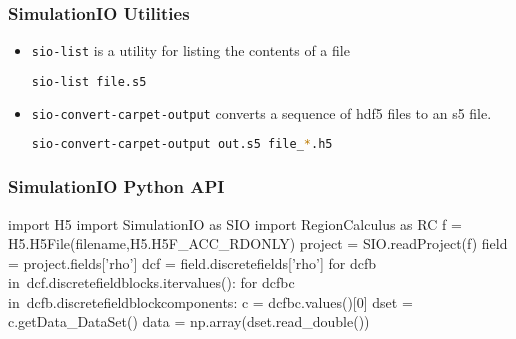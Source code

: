 \documentclass[]{beamer}
\begin{document}
\begin{frame}[fragile]
  \frametitle{SimulationIO Utilities}
  \begin{itemize}
  \item {\color{blue}\lstinline$sio-list$} is a utility for listing the contents of
    a file
\begin{lstlisting}[language=bash]
  sio-list file.s5
\end{lstlisting}
  \item {\color{blue}\lstinline$sio-convert-carpet-output$} converts a
    sequence of hdf5 files to an s5 file.
\begin{lstlisting}[language=bash]
  sio-convert-carpet-output out.s5 file_*.h5
\end{lstlisting}
  \end{itemize}
\end{frame}

\begin{frame}[fragile]
  \frametitle{SimulationIO Python API}
  \begin{python}
    import H5
    import SimulationIO as SIO
    import RegionCalculus as RC
    f = H5.H5File(filename,H5.H5F_ACC_RDONLY)
    project = SIO.readProject(f)
    field = project.fields['rho']
    dcf = field.discretefields['rho']
    for dcfb in\
    dcf.discretefieldblocks.itervalues():
        for dcfbc in\
        dcfb.discretefieldblockcomponents:
            c = dcfbc.values()[0]
            dset = c.getData_DataSet()
            data = np.array(dset.read_double())
  \end{python}
\end{frame}
\end{document}
